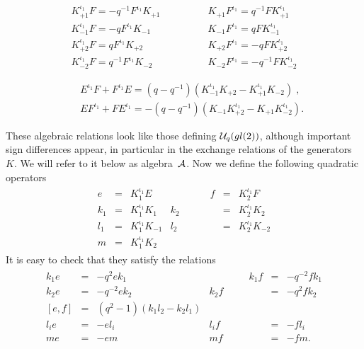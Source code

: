 \documentclass[a4paper,a4paper]{article}
\def\cA{{\cal A}}          \def\cB{{\cal B}}          \def\cC{{\cal C}}
\begin{document}
\begin{equation}
\label{K3}
\begin{array}{c}
 K_{+1}^{\iota_1} F = - q^{-1} F^{\iota_1} K_{+1} 
 \\[2mm]
 K_{-1}^{\iota_1} F = - q F^{\iota_1} K_{-1} 
 \\[2mm]
 K_{+2}^{\iota_1} F = q F^{\iota_1} K_{+2} 
 \\[2mm]
 K_{-2}^{\iota_1} F = q^{-1} F^{\iota_1}K_{-2} 
\end{array}
\qquad \qquad
\begin{array}{c}
 K_{+1} F^{\iota_1} = q^{-1} F K_{+1}^{\iota_1} 
 \\[2mm]
 K_{-1} F^{\iota_1} = q F K_{-1}^{\iota_1} 
 \\[2mm]
 K_{+2} F^{\iota_1} = - q F K_{+2}^{\iota_1} 
 \\[2mm]
 K_{-2} F^{\iota_1} = - q^{-1} FK_{-2}^{\iota_1} 
\end{array}
\end{equation}

\begin{eqnarray}
\label{K4}
  &&
  E^{\iota_1} F + F^{\iota_1} E = 
 (q-q^{-1}) \left( K_{-1}^{\iota_1} K_{+2} - K_{+1}^{\iota_1} K_{-2}
  \right) \;,
  \nonumber \\ && 
  E F^{\iota_1} + F E^{\iota_1} = - 
 (q-q^{-1}) \left( K_{-1} K_{+2}^{\iota_1} - K_{+1} K_{-2}^{\iota_1}
  \right) .
\end{eqnarray}

These algebraic relations look like those defining ${\cal U}_q(gl(2))$, although
important sign differences appear, in particular in the exchange
relations of the generators $K$. We will refer to it below as
algebra~$\cA$.
Now we define the following quadratic operators
\begin{eqnarray}
  \begin{array}{rclrcl}
    e &=& K^{\iota_1}_1 E & \qquad\qquad
  f &=& K^{\iota_1}_2 F \\[1.5mm]
  k_1 &=& K^{\iota_1}_1 K_{1} &
  k_2 &=& K^{\iota_1}_2 K_{2} \\[1.5mm]
  l_1 &=& K^{\iota_1}_1 K_{-1} &
  l_2 &=& K^{\iota_1}_2 K_{-2} \\[1.5mm]
  m &=& K^{\iota_1}_1 K_{2}
  \end{array}
  \label{eq:composite}
\end{eqnarray}
It is easy to check that they satisfy the relations
\begin{eqnarray}
  \begin{array}{rclrcl}
    k_1 e &=& -q^{2} e k_1  &\qquad \qquad
    k_1 f &=& -q^{-2} f k_1  \\[1.5mm]
    k_2 e &=& -q^{-2} e k_2  &
    k_2 f &=& -q^{2} f k_2  \\[1.5mm]
    \left[e,f\right] &=& (q^2-1) (k_1 l_2 - k_2 l_1) \\[1.5mm]
    l_i e &=& - e l_i  &
    l_i f &=& - f l_i  \\[1.5mm]
    m e &=& - e m  &
    m f &=& - f m .
  \end{array}
  \label{eq:sl2qi}
\end{eqnarray}
\end{document}
